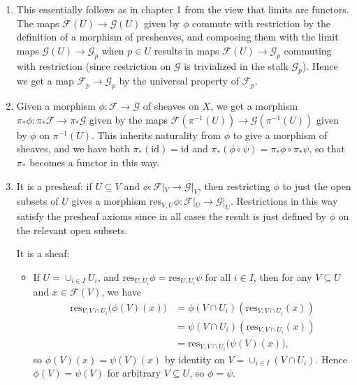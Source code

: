 \documentclass{report}
\newcommand{\id}{{\mathrm{id}}} %
\newcommand{\res}{{\mathrm{res}}} %
\newcommand{\scrF}{\mathscr{F}}
\newcommand{\scrG}{\mathscr{G}}
\begin{document}
\begin{enumerate}[label=\textbf{2.3.\Alph*.}]
	\item This essentially follows as in chapter 1 from the view that limits are
	      functors. The maps $\scrF(U)\to\scrG(U)$ given by $\phi$ commute with
	      restriction by the definition of a morphism of presheaves, and composing
	      them with the limit maps $\scrG(U)\to\scrG_p$ when $p\in U$ results in maps
	      $\scrF(U)\to\scrG_p$ commuting with restriction (since restriction on $\scrG$ is
	      trivialized in the stalk $\scrG_p$). Hence we get a map $\scrF_p\to\scrG_p$ by
	      the universal property of $\scrF_p$.

	\item Given a morphism $\phi:\scrF\to\scrG$ of sheaves on $X$, we get a morphism
	      $\pi_*\phi:\pi_*\scrF\to\pi_*\scrG$ given by the maps
	      $\scrF(\pi^{-1}(U))\to\scrG(\pi^{-1}(U))$ given by $\phi$ on $\pi^{-1}(U)$.
	      This inherits naturality from $\phi$ to give a morphism of sheaves, and
	      we have both $\pi_*(\id)=\id$ and
	      $\pi_*(\phi\circ\psi)=\pi_*\phi\circ\pi_*\psi$, so that $\pi_*$ becomes
	      a functor in this way.

	\item It is a presheaf: if $U\subseteq V$ and $\phi:\scrF|_V\to\scrG|_V$, then
	      restricting $\phi$ to just the open subsets of $U$ gives a morphism
	      $\res_{V,U}\phi:\scrF|_U\to\scrG|_U$. Restrictions in this way satisfy the
	      presheaf axioms since in all cases the result is just defined by $\phi$
	      on the relevant open subsets.

	      It is a sheaf:
	      \begin{itemize}
		      \item If $U=\cup_{i\in I}U_i$, and $\res_{U,U_i}\phi=\res_{U,U_i}\psi$
		            for all $i\in I$, then for any $V\subseteq U$ and $x\in\scrF(V)$,
		            we have
		            \begin{align*}
			            \res_{V,V\cap U_i}\bigl(\phi(V)(x)\bigr)
			             & = \phi(V\cap U_i)(\res_{V,V\cap U_i}(x))    \\
			             & = \psi(V\cap U_i)(\res_{V,V\cap U_i}(x))    \\
			             & = \res_{V,V\cap U_i}\bigl(\psi(V)(x)\bigr),
		            \end{align*}
		            so $\phi(V)(x)=\psi(V)(x)$ by identity on
		            $V=\cup_{i\in I}(V\cap U_i)$. Hence $\phi(V)=\psi(V)$ for
		            arbitrary $V\subseteq U$, so $\phi=\psi$.


\end{itemize}
\end{enumerate}
\end{document}
